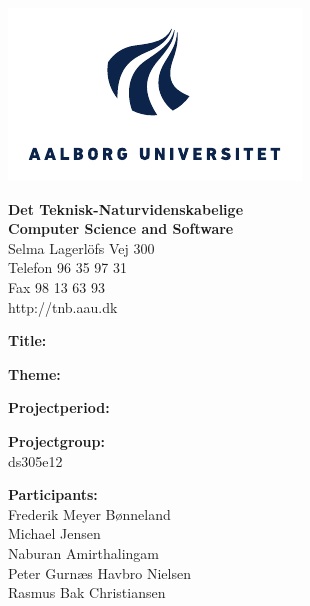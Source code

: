 \begin{titlepage}
	\begin{minipage}{0.40\textwidth}
		\includegraphics[width=\textwidth]{Images/aau-logo-new.pdf}
	\end{minipage}
	\hfill
	\begin{minipage}{0.40\textwidth}
		{\sf\small \textbf{Det Teknisk-Naturvidenskabelige}} \\
		{\sf\small \textbf{Computer Science and Software}} \\
		{\sf\small Selma Lagerlöfs Vej 300} \\
		{\sf\small Telefon 96 35 97 31} \\
		{\sf\small Fax 98 13 63 93} \\
		{\sf\small http://tnb.aau.dk}
	\end{minipage}

	\begin{minipage}{0.4\textwidth}
		\begin{description}
			\vspace{1cm}
			\item {\bf Title:}\\ \rtitle
			\item {\bf Theme:}\\ \rtheme 
			\item {\bf Projectperiod:}\\ \rperiod
			\item {\bf Projectgroup:}\\ ds305e12
			\item {\bf Participants:}\\
			Frederik Meyer Bønneland\\
			Michael Jensen\\
			Naburan Amirthalingam\\
			Peter Gurnæs Havbro Nielsen\\
			Rasmus Bak Christiansen\\


\end{description}
\end{minipage}
\end{titlepage}
